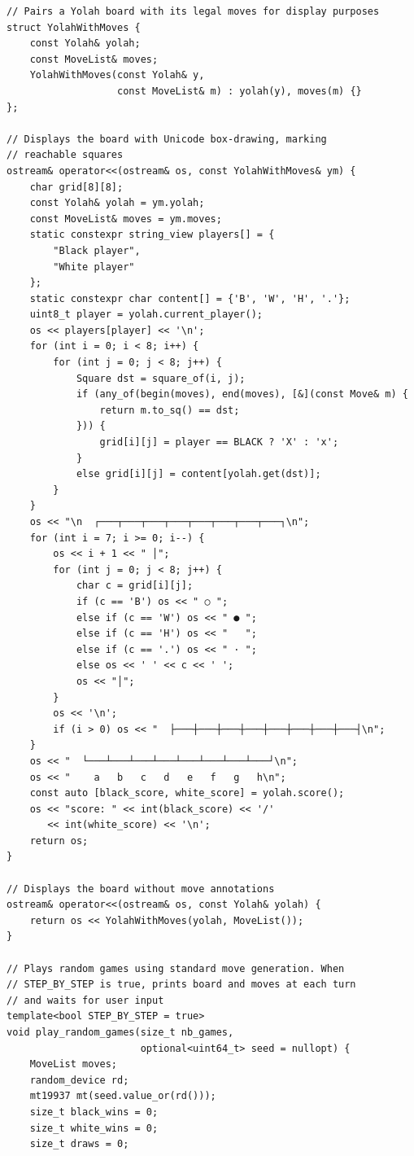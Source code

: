 \documentclass[12pt,a4paper,twoside,openright]{book}
\begin{document}
\begin{mdframed}[skipabove=\baselineskip,topline=false,rightline=false,bottomline=false,leftline=false,linewidth=1pt,linecolor=gray!40,innerleftmargin=8pt]
\begin{verbatim}
// Pairs a Yolah board with its legal moves for display purposes
struct YolahWithMoves {
    const Yolah& yolah;
    const MoveList& moves;
    YolahWithMoves(const Yolah& y, 
                   const MoveList& m) : yolah(y), moves(m) {}
};

// Displays the board with Unicode box-drawing, marking 
// reachable squares
ostream& operator<<(ostream& os, const YolahWithMoves& ym) {
    char grid[8][8];
    const Yolah& yolah = ym.yolah;
    const MoveList& moves = ym.moves;
    static constexpr string_view players[] = {
        "Black player",
        "White player"
    };
    static constexpr char content[] = {'B', 'W', 'H', '.'};
    uint8_t player = yolah.current_player();
    os << players[player] << '\n';
    for (int i = 0; i < 8; i++) {
        for (int j = 0; j < 8; j++) {
            Square dst = square_of(i, j);
            if (any_of(begin(moves), end(moves), [&](const Move& m) {
                return m.to_sq() == dst;
            })) {
                grid[i][j] = player == BLACK ? 'X' : 'x';
            }
            else grid[i][j] = content[yolah.get(dst)];
        }
    }
    os << "\n  ┌───┬───┬───┬───┬───┬───┬───┬───┐\n";
    for (int i = 7; i >= 0; i--) {
        os << i + 1 << " │";
        for (int j = 0; j < 8; j++) {
            char c = grid[i][j];
            if (c == 'B') os << " ○ ";
            else if (c == 'W') os << " ● ";
            else if (c == 'H') os << "   ";
            else if (c == '.') os << " · ";
            else os << ' ' << c << ' ';
            os << "│";
        }
        os << '\n';
        if (i > 0) os << "  ├───┼───┼───┼───┼───┼───┼───┼───┤\n";
    }
    os << "  └───┴───┴───┴───┴───┴───┴───┴───┘\n";
    os << "    a   b   c   d   e   f   g   h\n";
    const auto [black_score, white_score] = yolah.score();
    os << "score: " << int(black_score) << '/' 
       << int(white_score) << '\n';
    return os;
}

// Displays the board without move annotations
ostream& operator<<(ostream& os, const Yolah& yolah) {
    return os << YolahWithMoves(yolah, MoveList());    
}

// Plays random games using standard move generation. When 
// STEP_BY_STEP is true, prints board and moves at each turn 
// and waits for user input
template<bool STEP_BY_STEP = true>
void play_random_games(size_t nb_games, 
                       optional<uint64_t> seed = nullopt) {
    MoveList moves;
    random_device rd;
    mt19937 mt(seed.value_or(rd()));
    size_t black_wins = 0;
    size_t white_wins = 0;
    size_t draws = 0;


\end{verbatim}
\end{mdframed}
\end{document}
